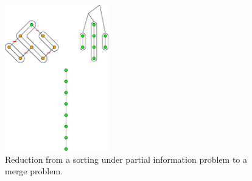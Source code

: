 \begin{figure}
	\centering
	\includegraphics[width=0.4\textwidth]{fig/sorting-under-partial-information-reduction:diag}
	\caption{\label{fig:sorting-under-partial-information-reduction:diag} Reduction from a sorting under partial information problem to a merge problem.}
\end{figure}
